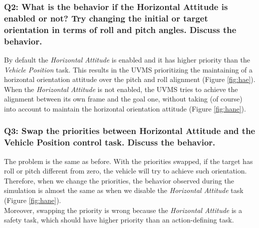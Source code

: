 \documentclass{article}
\begin{document}
\subsubsection{Q2: What is the behavior if the Horizontal Attitude is enabled or not? Try changing the initial or target orientation in terms of roll and pitch angles. Discuss the behavior.} 
By default the \textit{Horizontal Attitude} is enabled and it has higher priority than the \textit{Vehicle Position} task. 
This results in the UVMS prioritizing the maintaining of a horizontal orientation attitude over the pitch and roll alignment (Figure  \ref{fig:hae}). \\
When the \textit{Horizontal Attitude} is not enabled, the UVMS tries to achieve the alignment between its own frame and the goal one, without taking (of course) into account to maintain the horizontal orientation attitude (Figure  \ref{fig:hane}).

\subsubsection{Q3: Swap the priorities between Horizontal Attitude and the Vehicle Position control task. Discuss the behavior.}
The problem is the same as before. With the priorities swapped, if the target has roll or pitch different from zero, the vehicle will try to achieve such orientation. \\
Therefore, when we change the priorities, the behavior observed during the simulation is almost the same as when we disable the \textit{Horizontal Attitude} task  (Figure  \ref{fig:hane}).\\
Moreover, swapping the priority is wrong because the \textit{Horizontal Attitude} is a safety task, which should have higher priority than an action-defining task. 
\clearpage
\end{document}
